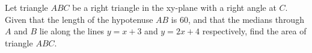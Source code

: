 Let triangle $ABC$ be a right triangle in the xy-plane with a right angle at $C$. Given that the length of the hypotenuse $AB$ is 60, and that the medians through $A$ and $B$ lie along the lines $y=x+3$ and $y=2x+4$ respectively, find the area of triangle $ABC$.